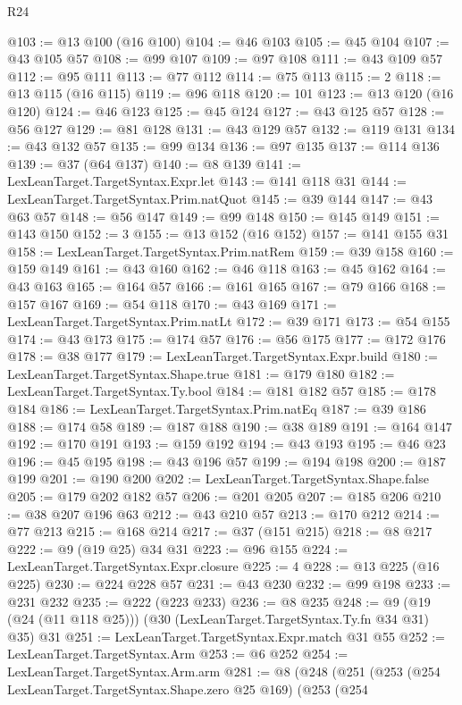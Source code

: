 \begin{lexlean}{R24}
\begin{coremodule}
@103 := @13 @100 (@16 @100)
@104 := @46 @103
@105 := @45 @104
@107 := @43 @105 @57
@108 := @99 @107
@109 := @97 @108
@111 := @43 @109 @57
@112 := @95 @111
@113 := @77 @112
@114 := @75 @113
@115 := 2
@118 := @13 @115 (@16 @115)
@119 := @96 @118
@120 := 101
@123 := @13 @120 (@16 @120)
@124 := @46 @123
@125 := @45 @124
@127 := @43 @125 @57
@128 := @56 @127
@129 := @81 @128
@131 := @43 @129 @57
@132 := @119 @131
@134 := @43 @132 @57
@135 := @99 @134
@136 := @97 @135
@137 := @114 @136
@139 := @37 (@64 @137)
@140 := @8 @139
@141 := LexLeanTarget.TargetSyntax.Expr.let
@143 := @141 @118 @31
@144 := LexLeanTarget.TargetSyntax.Prim.natQuot
@145 := @39 @144
@147 := @43 @63 @57
@148 := @56 @147
@149 := @99 @148
@150 := @145 @149
@151 := @143 @150
@152 := 3
@155 := @13 @152 (@16 @152)
@157 := @141 @155 @31
@158 := LexLeanTarget.TargetSyntax.Prim.natRem
@159 := @39 @158
@160 := @159 @149
@161 := @43 @160
@162 := @46 @118
@163 := @45 @162
@164 := @43 @163
@165 := @164 @57
@166 := @161 @165
@167 := @79 @166
@168 := @157 @167
@169 := @54 @118
@170 := @43 @169
@171 := LexLeanTarget.TargetSyntax.Prim.natLt
@172 := @39 @171
@173 := @54 @155
@174 := @43 @173
@175 := @174 @57
@176 := @56 @175
@177 := @172 @176
@178 := @38 @177
@179 := LexLeanTarget.TargetSyntax.Expr.build
@180 := LexLeanTarget.TargetSyntax.Shape.true
@181 := @179 @180
@182 := LexLeanTarget.TargetSyntax.Ty.bool
@184 := @181 @182 @57
@185 := @178 @184
@186 := LexLeanTarget.TargetSyntax.Prim.natEq
@187 := @39 @186
@188 := @174 @58
@189 := @187 @188
@190 := @38 @189
@191 := @164 @147
@192 := @170 @191
@193 := @159 @192
@194 := @43 @193
@195 := @46 @23
@196 := @45 @195
@198 := @43 @196 @57
@199 := @194 @198
@200 := @187 @199
@201 := @190 @200
@202 := LexLeanTarget.TargetSyntax.Shape.false
@205 := @179 @202 @182 @57
@206 := @201 @205
@207 := @185 @206
@210 := @38 @207 @196 @63
@212 := @43 @210 @57
@213 := @170 @212
@214 := @77 @213
@215 := @168 @214
@217 := @37 (@151 @215)
@218 := @8 @217
@222 := @9 (@19 @25) @34 @31
@223 := @96 @155
@224 := LexLeanTarget.TargetSyntax.Expr.closure
@225 := 4
@228 := @13 @225 (@16 @225)
@230 := @224 @228 @57
@231 := @43 @230
@232 := @99 @198
@233 := @231 @232
@235 := @222 (@223 @233)
@236 := @8 @235
@248 := @9 (@19 (@24 (@11 @118 @25))) (@30 (LexLeanTarget.TargetSyntax.Ty.fn @34 @31) @35) @31
@251 := LexLeanTarget.TargetSyntax.Expr.match @31 @55
@252 := LexLeanTarget.TargetSyntax.Arm
@253 := @6 @252
@254 := LexLeanTarget.TargetSyntax.Arm.arm
@281 := @8
    (@248
      (@251
        (@253
          (@254 LexLeanTarget.TargetSyntax.Shape.zero @25 @169)
          (@253
            (@254

\end{coremodule}
\end{lexlean}
